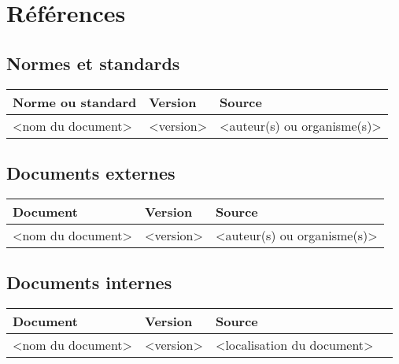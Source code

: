 %

\section{Références}
\label{sec:references}

\subsection{Normes et standards}
\label{subsec:reference:normes}

\begin{tabular}{|l|l|l|}
\hline
\textbf{Norme ou standard} & \textbf{Version} & \textbf{Source} \\
\hline
<nom du document> & <version> & <auteur(s) ou organisme(s)>\\
\hline
\end{tabular} 


\subsection{Documents externes}
\label{subsec:references:externes}


\begin{tabular}{|l|l|l|}
\hline
\textbf{Document} & \textbf{Version} & \textbf{Source} \\
\hline
<nom du document> & <version> & <auteur(s) ou organisme(s)>\\
\hline
\end{tabular} 


\subsection{Documents internes}
\label{subsec:references:internes}


\begin{tabular}{|l|l|l|l|}
\hline
\textbf{Document} & \textbf{Version} & \textbf{Source} \\
\hline
<nom du document> & <version> & <localisation du document>\\
\hline
\end{tabular} 


